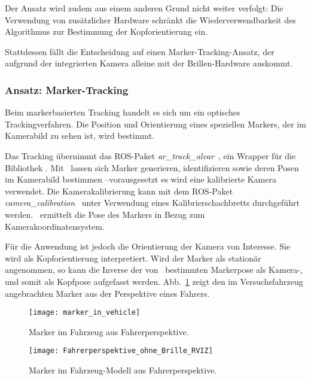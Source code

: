 Der Ansatz wird zudem aus einem anderen Grund nicht weiter verfolgt:
Die Verwendung von zusätzlicher Hardware schränkt die Wiederverwendbarkeit des Algorithmus zur Bestimmung der Kopforientierung ein.

Stattdessen fällt die Entscheidung auf einen Marker-Tracking-Ansatz, der aufgrund der integrierten Kamera alleine mit der Brillen-Hardware auskommt.


\subsubsection{Ansatz: Marker-Tracking}
\label{headtracking_markertracking_subsubsec}

Beim markerbasierten Tracking handelt es sich um ein optisches Trackingverfahren.
Die Position und Orientierung eines speziellen Markers, der im Kamerabild zu sehen ist, wird bestimmt.

Das Tracking übernimmt das \ac{ROS}-Paket \emph{ar\_track\_alvar}~\cite{ros_ar_track_alvar}, ein Wrapper für die Bibliothek \alvar.
Mit \alvar \ lassen sich Marker generieren, identifizieren sowie deren Posen im Kamerabild bestimmen --vorausgesetzt es wird eine kalibrierte Kamera verwendet.
Die Kamerakalibrierung kann mit dem \ac{ROS}-Paket \emph{camera\_calibration}~\cite{ros_camera_calibration} unter Verwendung eines Kalibrierschachbretts durchgeführt werden.
\alvar \ ermittelt die Pose des Markers in Bezug zum Kamerakoordinatensystem.

Für die Anwendung ist jedoch die Orientierung der Kamera von Interesse.
Sie wird als Kopforientierung interpretiert.
Wird der Marker als stationär angenommen, so kann die Inverse der von \alvar \ bestimmten Markerpose als Kamera-, und somit als Kopfpose aufgefasst werden.
Abb.~\ref{fig:marker_in_vehicle_driver_view} zeigt den im Versuchsfahrzeug angebrachten Marker aus der Perspektive eines Fahrers.

\begin{figure}
  \centering
  \texttt{[image: marker\_in\_vehicle]}
  \caption{Marker im Fahrzeug aus Fahrerperspektive.}
  \label{fig:marker_in_vehicle_driver_view}
\end{figure}

\begin{figure}
  \centering
  \texttt{[image: Fahrerperspektive\_ohne\_Brille\_RVIZ]}
  \caption{Marker im Fahrzeug-Modell aus Fahrerperspektive.}
  \label{fig:marker_in_vehicle_model_driver_view}
\end{figure}

